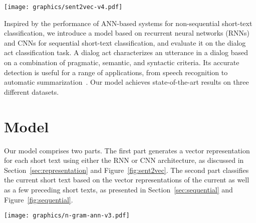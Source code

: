 \documentclass[11pt,letterpaper]{article}
\begin{document}
\begin{figure*}[!ht]
  \centering
      \texttt{[image: graphics/sent2vec-v4.pdf]}
\vspace{-0.0cm}
  \caption{RNN (left) and CNN (right) architectures for generating the vector representation $\mathbf{s}$ of a short text $\mathbf{x}_{1:\ell}$. For CNN, Conv refers to convolution operations, and the filter height $h=3$ is used in this figure.\vspace{-0.1cm}}
  \label{fig:sent2vec}
\end{figure*}


Inspired by the performance of ANN-based systems for non-sequential short-text classification, we introduce a model based on recurrent neural networks (RNNs) and CNNs for sequential short-text classification, and evaluate it on the dialog act classification task.
A dialog act characterizes an utterance in a dialog based on a combination of pragmatic, semantic, and syntactic criteria. Its accurate detection is useful for a range of applications, from speech recognition to automatic summarization~\cite{stolcke2000dialogue}. Our model achieves state-of-the-art results on three different datasets.

 
\section{Model} \label{sec:model}
Our model comprises two parts. The first part generates a vector representation for each short text using either the RNN or CNN architecture, as discussed in Section~\ref{sec:representation} and Figure~\ref{fig:sent2vec}. The second part classifies the current short text based on the vector representations of the current as well as a few preceding short texts, as presented in Section~\ref{sec:sequential} and Figure~\ref{fig:sequential}.

\begin{figure*}[!ht]
  \centering
      \texttt{[image: graphics/n-gram-ann-v3.pdf]}
\vspace{0.1cm}
  \caption{Four instances of the two-layer feedforward ANN used for predicting the probability distribution over the classes $\mathbf{z}_i$ for the $i^{th}$ short-text $\mathbf{X}_i$. S2V stands for short text to vector, which is the RNN/CNN architecture that generates $\mathbf{s}_i$ from $\mathbf{X}_i$. From left to right, the history sizes $(d_1, d_2)$ are $(0, 0), (2, 0), (0, 2)$ and $(1, 1)$. $(0, 0)$ corresponds to the non-sequential classification case.\vspace{-0.2cm}}
  \label{fig:sequential}
\end{figure*}
\end{document}
